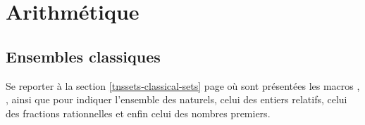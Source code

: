 \documentclass[12pt,a4paper]{article}
\begin{document}
\chapter{Arithmétique}

\section{Ensembles classiques}

Se reporter à la section \ref{tnssets-classical-sets} page \pageref{tnssets-classical-sets} où sont présentées les macros , ,  ainsi que  pour indiquer l'ensemble des naturels, celui des entiers relatifs, celui des fractions rationnelles et enfin celui des nombres premiers.
\end{document}
